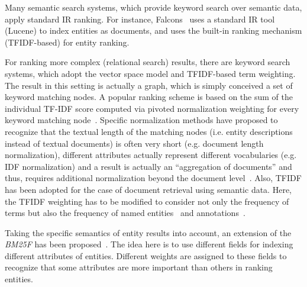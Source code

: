 Many semantic search systems, which provide keyword search over semantic data, apply standard IR ranking. For instance, Falcons~\cite{DBLP:journals/ijswis/ChengQ09} uses a standard IR tool (Lucene) to index entities as documents, and uses the built-in ranking mechanism (TFIDF-based) for entity ranking.  

For ranking more complex (relational search) results, there are keyword search systems, which adopt the vector space model and TFIDF-based term weighting. The result in this setting is actually a graph, which is simply conceived a set of keyword matching nodes. A popular ranking scheme is based on the sum of the individual TF-IDF score computed via pivoted normalization weighting for every keyword matching node~\cite{DBLP:conf/icde/TranWRC09}. Specific normalization methods have proposed to recognize that the textual length of the matching nodes (i.e. entity descriptions instead of textual documents) is often very short (e.g. document length normalization), different attributes actually represent different vocabularies (e.g. IDF normalization) and a result is actually an ``aggregation of documents'' and thus, requires additional normalization beyond the document level~\cite{DBLP:conf/sigmod/LiuYMC06}. Also, TFIDF has been adopted for the case of document retrieval using semantic data. Here, the TFIDF weighting has to be modified to consider not only the frequency of terms but also the frequency of named entities~\cite{DBLP:series/sci/NgoC10} and annotations~\cite{DBLP:journals/tkde/CastellsFV07}.  


Taking the specific semantics of entity results into account, an extension of the \emph{BM25F} has been proposed~\cite{DBLP:conf/semweb/BlancoMV11}. The idea here is to use different fields for indexing different attributes of entities. Different weights are assigned to these fields to recognize that some attributes are more important than others in ranking entities. 

